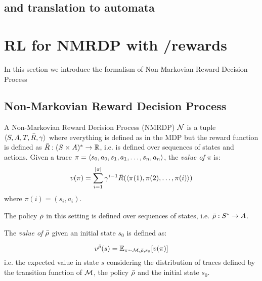 \newcommand{\Rnm}{\bar{R}}
\newcommand{\rhonm}{\bar{\rho}}





\subsection{\LTLf and \LDLf translation to automata}

\section{RL for NMRDP with \LTLf/\LDLf rewards}
In this section we introduce the formalism of Non-Markovian Reward Decision Process \citep{BacchusBG96} 
\subsection{Non-Markovian Reward Decision Process}
\label{NMRDP}
A Non-Markovian Reward Decision Process (NMRDP) $\mathcal{N}$ is a tuple $\langle S, A, T, \bar{R}, \gamma \rangle$ where everything is defined as in the MDP but the reward function is defined as $\bar{R} : (S \times A)^* \to \mathbb{R}$, i.e. is defined over sequences of states and actions. 	Given a trace $\pi = \langle s_0, a_0, s_1, a_1, \dots, s_n, a_n \rangle$, the \emph{value of $\pi$} is:
$$
v(\pi) = \sum_{i=1}^{|\pi|} \gamma^{i-1}\bar{R}(\langle \pi(1), \pi(2), \dots, \pi(i) \rangle)
$$
where $\pi(i) = (s_i, a_i)$.

The policy $\bar{\rho}$ in this setting is defined over sequences of states, i.e. $\bar{\rho}: S^* \to A$. 

The \emph{value of $\bar{\rho}$} given an initial state $s_0$ is defined as:

$$
v^{\bar{\rho}}(s) = \mathbb{E}_{\pi \sim \mathcal{M}, \bar{\rho}, s_0}[v(\pi)]
$$
i.e. the expected value in state $s$ considering the distribution of traces defined by the transition function of $\mathcal{M}$, the policy $\bar{\rho}$ and the initial state $s_0$.

